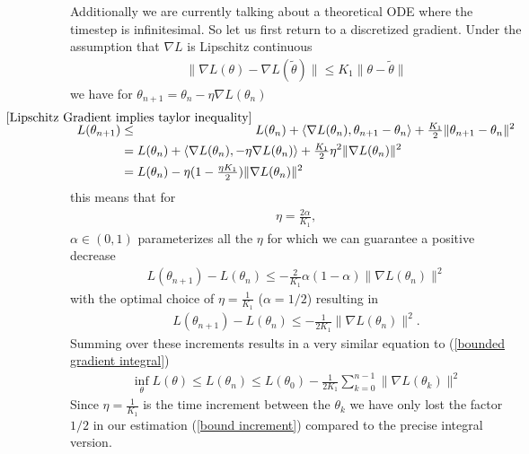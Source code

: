 Additionally we are currently talking about a theoretical ODE where the timestep
is infinitesimal. So let us first return to a discretized gradient. Under the
assumption that \(\nabla L\) is Lipschitz continuous
%
\begin{align*}
	\| \nabla L(\theta) - \nabla L(\tilde{\theta})\| \le K_1 \|\theta-\tilde{\theta}\|
\end{align*}
%
we have for \(\theta_{n+1}=\theta_n-\eta\nabla L(\theta_n)\)
%
\begin{align}
	L(\theta_{n+1})
	&\lxle{\ref{Lipschitz Gradient implies taylor inequality}} L(\theta_n) 
	+ \langle\nabla L(\theta_n),\theta_{n+1} - \theta_n\rangle
	+ \tfrac{K_1}{2} \| \theta_{n+1} - \theta_n\|^2 
	\label{bound increment}\\
	&= L(\theta_n)
	+ \langle\nabla L(\theta_n), -\eta\nabla L(\theta_n)\rangle
	+ \tfrac{K_1}{2}\eta^2\| \nabla L(\theta_n)\|^2
	\nonumber\\
	&=L(\theta_n) - \eta(1-\tfrac{\eta K_1}{2})\|\nabla L(\theta_n)\|^2
	\nonumber
\end{align}
%
this means that for
\begin{align}\label{learning rate restrictions}
	\eta=\tfrac{2\alpha}{K_1},
\end{align}
%
\(\alpha \in (0,1)\) parameterizes all the \(\eta\) for which we can guarantee
a positive decrease
%
\begin{align*}
	L(\theta_{n+1}) - L(\theta_n)
	\le - \tfrac{2}{K_1}\alpha (1-\alpha)\|\nabla L(\theta_n)\|^2
\end{align*}
%
with the optimal choice of \(\eta=\tfrac{1}{K_1}\) (\(\alpha=1/2\)) resulting
in 
%
\begin{align*}
	L(\theta_{n+1}) - L(\theta_n)
	\le - \tfrac{1}{2K_1}\|\nabla L(\theta_n)\|^2.
\end{align*}
%
Summing over these increments results in a very similar equation to
(\ref{bounded gradient integral})
%
\begin{align*}
	\inf_{\theta} L(\theta) \le L(\theta_n) 
	\le L(\theta_0) - \tfrac{1}{2K_1} \sum_{k=0}^{n-1}\|\nabla L(\theta_k)\|^2
\end{align*}
%
Since \(\eta=\tfrac{1}{K_1}\) is the time increment between the \(\theta_k\)
we have only lost the factor \(1/2\) in our estimation (\ref{bound increment})
compared to the precise integral version.

